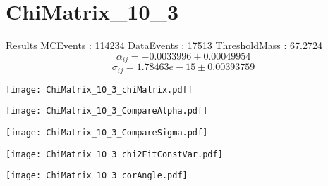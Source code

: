 \documentclass[a4paper,12pt]{article}
\begin{document}
\section{ChiMatrix\_10\_3}
\begin{minipage}{0.49\linewidth} Results \newline
MCEvents : 114234\newline
DataEvents : 17513 \newline
ThresholdMass : 67.2724\\
$$\alpha_{ij} = -0.0033996\pm 0.00049954$$
$$\sigma_{ij} = 1.78463e-15\pm 0.00393759$$
\end{minipage}\hfill
\begin{minipage}{0.49\linewidth} 
\texttt{[image: ChiMatrix\_10\_3\_chiMatrix.pdf]}\\
\end{minipage}
\hfill
\begin{minipage}{0.49\linewidth} 
\texttt{[image: ChiMatrix\_10\_3\_CompareAlpha.pdf]}\\
\end{minipage}
\hfill
\begin{minipage}{0.49\linewidth} 
\texttt{[image: ChiMatrix\_10\_3\_CompareSigma.pdf]}\\
\end{minipage}
\begin{minipage}{0.49\linewidth} 
\texttt{[image: ChiMatrix\_10\_3\_chi2FitConstVar.pdf]}\\
\end{minipage}
\hfill
\begin{minipage}{0.49\linewidth} 
\texttt{[image: ChiMatrix\_10\_3\_corAngle.pdf]}\\
\end{minipage}
\end{document}
